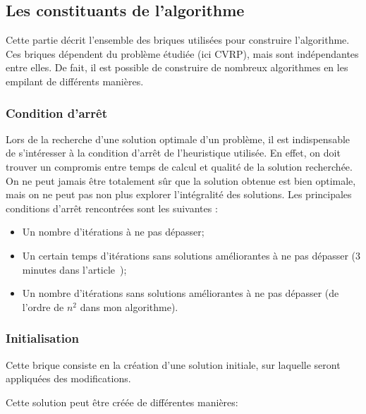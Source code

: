 \documentclass[a4paper,11pt]{article}%
\begin{document}
\subsection{Les constituants de l'algorithme}
Cette partie décrit l'ensemble des briques utilisées pour construire l'algorithme. Ces briques dépendent du problème étudiée (ici CVRP), mais sont indépendantes entre elles. De fait, il est possible de construire de nombreux algorithmes en les empilant de différents manières.

\subsubsection{Condition d'arrêt}

Lors de la recherche d'une solution optimale d'un problème, il est indispensable de s'intéresser à la condition d'arrêt de l'heuristique utilisée. En effet, on doit trouver un compromis entre temps de calcul et qualité de la solution recherchée. On ne peut jamais être totalement sûr que la solution obtenue est bien optimale, mais on ne peut pas non plus explorer l'intégralité des solutions. Les principales conditions d'arrêt rencontrées sont les suivantes :
\begin{itemize}
\item Un nombre d'itérations à ne pas dépasser;
\item Un certain temps d'itérations sans solutions améliorantes à ne pas dépasser (3 minutes dans l'article~\cite{Sorensen_2017});
\item Un nombre d'itérations sans solutions améliorantes à ne pas dépasser (de l'ordre de $n^2$ dans mon algorithme). 
\end{itemize}

\subsubsection{Initialisation}
Cette brique consiste en la création d'une solution initiale, sur laquelle seront appliquées des modifications. 

Cette solution peut être créée de différentes manières:
\end{document}
